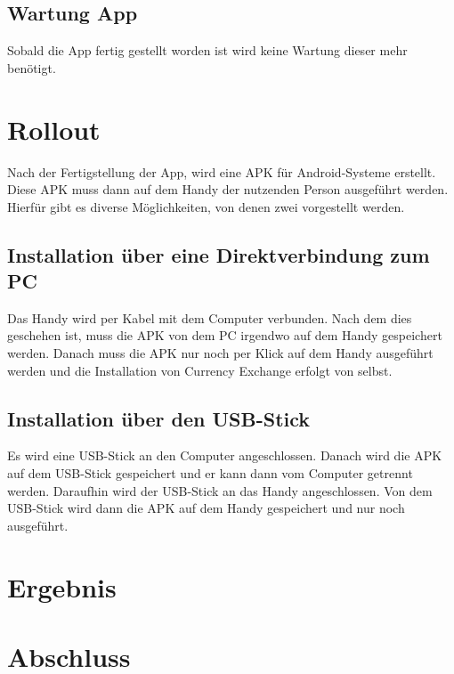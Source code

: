 \documentclass[conference]{IEEEtran}
\begin{document}
\subsection{Wartung App}
Sobald die App fertig gestellt worden ist wird keine Wartung dieser mehr benötigt.

\section{Rollout}
Nach der Fertigstellung der App, wird eine APK für Android-Systeme erstellt. Diese APK muss dann auf dem Handy der nutzenden Person ausgeführt werden. Hierfür gibt es diverse Möglichkeiten, von denen zwei vorgestellt werden. 

\subsection{Installation über eine Direktverbindung zum PC}
Das Handy wird per Kabel mit dem Computer verbunden. Nach dem dies geschehen ist, muss die APK von dem PC irgendwo auf dem Handy gespeichert werden. Danach muss die APK nur noch per Klick auf dem Handy ausgeführt werden und die Installation von Currency Exchange erfolgt von selbst.

\subsection{Installation über den USB-Stick}
Es wird eine USB-Stick an den Computer angeschlossen. Danach wird die APK auf dem USB-Stick gespeichert und er kann dann vom Computer getrennt werden. Daraufhin wird der USB-Stick an das Handy angeschlossen. Von dem USB-Stick wird dann die APK auf dem Handy gespeichert und nur noch ausgeführt. 

\section{Ergebnis}

\section{Abschluss}
\end{document}
